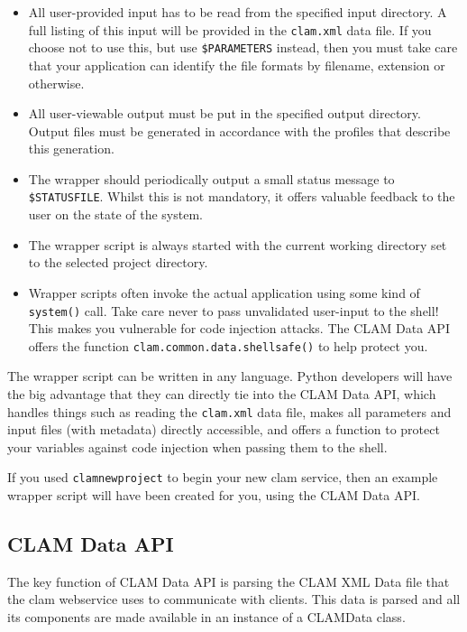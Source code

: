 \documentclass[a4paper,12pt]{report}
\begin{document}
\begin{itemize}
\item All user-provided input has to be read from the specified input directory. A full listing of this input will be provided in the \texttt{clam.xml} data file. If you choose not to use this, but use \texttt{\$PARAMETERS} instead, then you must take care that your application can identify the file formats by filename, extension or otherwise.
\item All user-viewable output must be put in the specified output directory. Output files must be generated in accordance with the profiles that describe this generation. 
\item The wrapper should periodically output a small status message to \texttt{\$STATUSFILE}. Whilst this is not mandatory, it offers valuable feedback to the user on the state of the system. 
\item The wrapper script is always started with the current working directory set to the selected project directory.
\item Wrapper scripts often invoke the actual application using some kind of
  \texttt{system()} call. Take care never to pass unvalidated user-input to the shell! This makes you vulnerable
  for code injection attacks. The CLAM Data API offers the function
  \texttt{clam.common.data.shellsafe()} to help protect you.
\end{itemize}

The wrapper script can be written in any language. Python developers will have
the big advantage that they can directly tie into the CLAM Data API, which
handles things such as reading the \texttt{clam.xml} data file, makes all
parameters and input files (with metadata) directly accessible, and offers a
function to protect your variables against code injection when passing them to
the shell.

If you used \texttt{clamnewproject} to begin your new clam service, then an example
wrapper script will have been created for you, using the CLAM Data API.

\subsection{CLAM Data API}

The key function of CLAM Data API is parsing the CLAM XML Data file that the
clam webservice uses to communicate with clients. This data is parsed and all
its components are made available in an instance of a CLAMData class.
\end{document}
